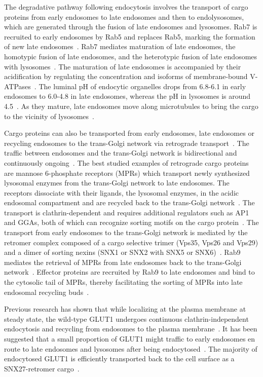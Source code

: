 The degradative pathway following endocytosis involves the transport of cargo proteins from early endosomes to late endosomes and then to endolysosomes, which are generated through the fusion of late endosomes and lysosomes. Rab7 is recruited to early endosomes by Rab5 and replaces Rab5, marking the formation of new late endosomes~\cite{Huotari}. Rab7 mediates maturation of late endosomes, the homotypic fusion of late endosomes, and the heterotypic fusion of late endosomes with lysosomes~\cite{Stenmark}. The maturation of late endosomes is accompanied by their acidification by regulating the concentration and isoforms of membrane-bound V-ATPases~\cite{Huotari}. The luminal pH of endocytic organelles drops from 6.8-6.1 in early endosomes to 6.0-4.8 in late endosomes, whereas the pH in lysosomes is around 4.5~\cite{Maxfield}. As they mature, late endosomes move along microtubules to bring the cargo to the vicinity of lysosomes~\cite{Huotari}.

Cargo proteins can also be transported from early endosomes, late endosomes or recycling endosomes to the trans-Golgi network via retrograde transport~\cite{Huotari,Johannes}. The traffic between endosomes and the trans-Golgi network is bidirectional and continuously ongoing~\cite{Huotari}. The best studied examples of retrograde cargo proteins are mannose 6-phosphate receptors (MPRs) which transport newly synthesized lysosomal enzymes from the trans-Golgi network to late endosomes. The receptors dissociate with their ligands, the lysosomal enzymes, in the acidic endosomal compartment and are recycled back to the trans-Golgi network~\cite{Progida}. The transport is clathrin-dependent and requires additional regulators such as AP1 and GGAs, both of which can recognize sorting motifs on the cargo protein~\cite{Klinger}. The transport from early endosomes to the trans-Golgi network is mediated by the retromer complex composed of a cargo selective trimer (Vps35, Vps26 and Vps29) and a dimer of sorting nexins (SNX1 or SNX2 with SNX5 or SNX6)~\cite{Johannes,Seaman}. Rab9 mediates the retrieval of MPRs from late endosomes back to the trans-Golgi network~\cite{Stenmark}. Effector proteins are recruited by Rab9 to late endosomes and bind to the cytosolic tail of MPRs, thereby facilitating the sorting of MPRs into late endosomal recycling buds~\cite{Stenmark}. 

Previous research has shown that while localizing at the plasma membrane at steady state, the wild-type GLUT1 undergoes continuous clathrin-independent endocytosis and recycling from endosomes to the plasma membrane~\cite{Eyster,McGough}. It has been suggested that a small proportion of GLUT1 might traffic to early endosomes en route to late endosomes and lysosomes after being endocytosed~\cite{Eyster,McGough}. The majority of endocytosed GLUT1 is efficiently transported back to the cell surface as a SNX27-retromer cargo~\cite{Steinberg}.
